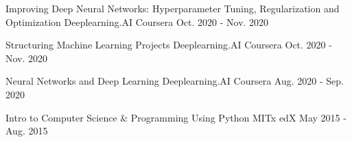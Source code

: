 
\begin{cventries}

  \cventry
    {Improving Deep Neural Networks: Hyperparameter Tuning, Regularization and Optimization} %
    {Deeplearning.AI} %
    {Coursera} %
    {Oct. 2020 - Nov. 2020} %
    {}

  \cventry
    {Structuring Machine Learning Projects} %
    {Deeplearning.AI} %
    {Coursera} %
    {Oct. 2020 - Nov. 2020} %
    {}

  \cventry
    {Neural Networks and Deep Learning} %
    {Deeplearning.AI} %
    {Coursera} %
    {Aug. 2020 - Sep. 2020} %
    {}

  \cventry
    {Intro to Computer Science \& Programming Using Python} %
    {MITx} %
    {edX} %
    {May 2015 - Aug. 2015} %
    {}

\end{cventries}